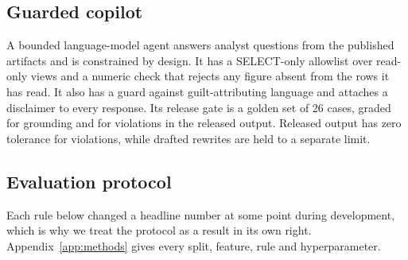 \documentclass[conference]{IEEEtran}
\begin{document}
\subsection{Guarded copilot}

A bounded language-model agent answers analyst questions from the published
artifacts and is constrained by design. It has a SELECT-only allowlist over
read-only views and a numeric check that rejects any figure absent from the
rows it has read. It also has a guard against guilt-attributing language and
attaches a disclaimer to every response. Its release gate is a golden set of 26 cases, graded for
grounding and for violations in the released output. Released output has zero
tolerance for violations, while drafted rewrites are held to a separate
limit.

\subsection{Evaluation protocol}
\label{sec:protocol}

Each rule below changed a headline number at some point during development,
which is why we treat the protocol as a result in its own right.
Appendix~\ref{app:methods} gives every split, feature, rule and
hyperparameter.
\end{document}

